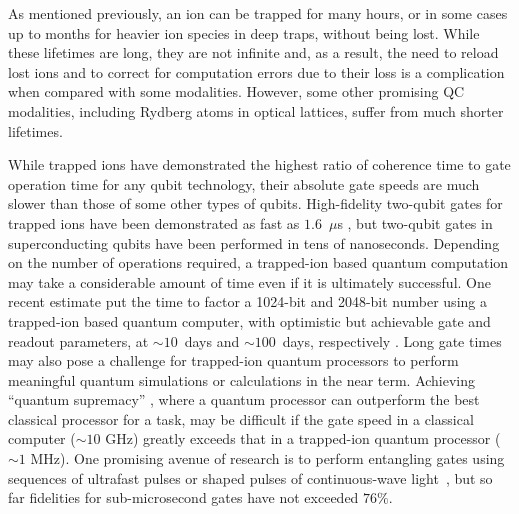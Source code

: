 \documentclass[%
12pt,
 amsmath,amssymb,
]{revtex4-2}
\begin{document}
As mentioned previously, an ion can be trapped for many hours, or in some cases up to months for heavier ion species in deep traps, without being lost. While these lifetimes are long, they are not infinite and, as a result, the need to reload lost ions and to correct for computation errors due to their loss is a complication when compared with some modalities. However, some other promising QC modalities, including Rydberg atoms in optical lattices, suffer from much shorter lifetimes.

While trapped ions have demonstrated the highest ratio of coherence time to gate operation time for any qubit technology, their absolute gate speeds are much slower than those of some other types of qubits. High-fidelity two-qubit gates for trapped ions have been demonstrated as fast as $1.6$~$\mu$s \cite{SchaferFastIonGates2018}, but two-qubit gates in superconducting qubits have been performed in tens of nanoseconds. Depending on the number of operations required, a trapped-ion based quantum computation may take a considerable amount of time even if it is ultimately successful. One recent estimate put the time to factor a 1024-bit and 2048-bit number using a trapped-ion based quantum computer, with optimistic but achievable gate and readout parameters, at ${\sim}10$~days and ${\sim}100$~days, respectively \cite{LekitscheMicrowaveBlueprint2017}. Long gate times may also pose a challenge for trapped-ion quantum processors to perform meaningful quantum simulations or calculations in the near term. Achieving ``quantum supremacy'' \cite{HarrowQuantumSupremacy}, where a quantum processor can outperform the best classical processor for a task, may be difficult if the gate speed in a classical computer (${\sim}10$ GHz) greatly exceeds that in a trapped-ion quantum processor (${\sim}1$ MHz). One promising avenue of research is to perform entangling gates using sequences of ultrafast pulses \cite{WongCamposUltrafast2017} or shaped pulses of continuous-wave light~\cite{SchaferFastIonGates2018}, but so far fidelities for sub-microsecond gates have not exceeded $76 \%$.
\end{document}
